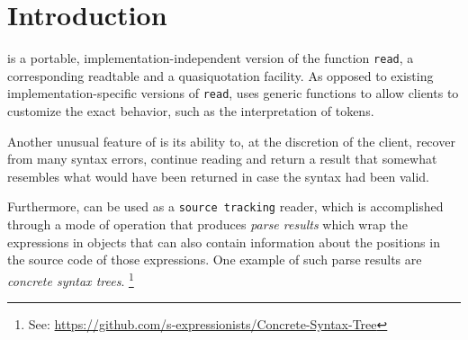 \chapter{Introduction}

\sysname{} is a portable, implementation-independent version of the
\commonlisp{} function \texttt{read}, a corresponding readtable and a
quasiquotation facility.  As opposed to existing
implementation-specific versions of \texttt{read}, \sysname{} uses
generic functions to allow clients to customize the exact behavior,
such as the interpretation of tokens.

Another unusual feature of \sysname{} is its ability to, at the
discretion of the client, recover from many syntax errors, continue
reading and return a result that somewhat resembles what would have
been returned in case the syntax had been valid.

Furthermore, \sysname{} can be used as a \texttt{source tracking}
reader, which is accomplished through a mode of operation that
produces \emph{parse results} which wrap the \commonlisp{} expressions
in objects that can also contain information about the positions in
the source code of those expressions.  One example of such parse
results are \emph{concrete syntax trees}.%
\footnote{See: \url{https://github.com/s-expressionists/Concrete-Syntax-Tree}}
